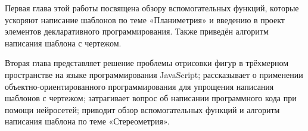 Первая глава этой работы посвящена обзору вспомогательных функций, которые ускоряют написание шаблонов по теме «Планиметрия» и введению в проект элементов декларативного программирования. Также приведён алгоритм написания шаблона с чертежом.

Вторая глава представляет решение проблемы отрисовки фигур в трёхмерном пространстве на языке программирования JavaScript; рассказывает о применении объектно-ориентированного программирования для упрощения написания шаблонов с чертежом; затрагивает вопрос об написании программного кода при помощи нейросетей; приводит обзор вспомогательных функций и алгоритм написания шаблона по теме «Стереометрия». 
